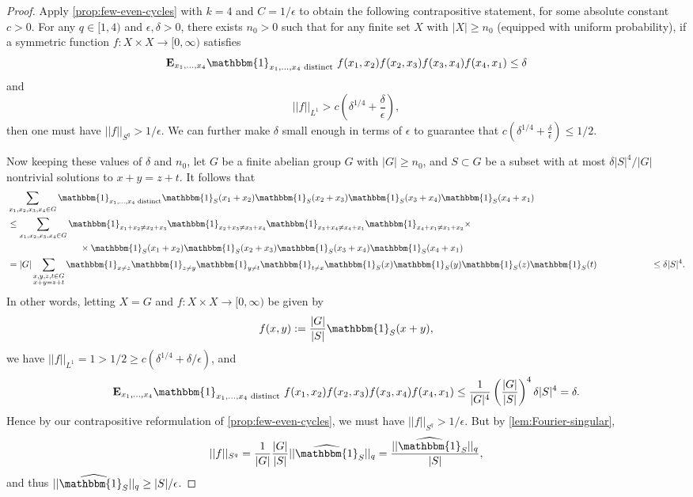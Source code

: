 \documentclass[reqno,11pt]{amsart}
\theoremstyle{definition}
\theoremstyle{remark}
\numberwithin{equation}{section}
\newcommand{\E}{\mathbf{E}}
\newcommand{\one}{\mathbbm{1}}
\renewcommand{\hat}{\widehat}
\begin{document}
\begin{proof}
Apply \cref{prop:few-even-cycles} with $k = 4$ and $C = 1/\epsilon$ to obtain the following contrapositive statement, for some absolute constant $c > 0$. For any $q \in [1, 4)$ and $\epsilon, \delta > 0$, there exists $n_0 > 0$ such that for any finite set $X$ with $|X| \ge n_0$ (equipped with uniform probability), if a symmetric function $f : X \times X \to [0, \infty)$ satisfies
\[
    \E_{x_1, \ldots, x_4} \one_{x_1,\ldots, x_4 \text{ distinct}}\ f(x_1, x_2)f(x_2, x_3)f(x_3,x_4)f(x_4,x_1) \le \delta
\]
and 
\[
    ||f||_{L^1} > c \left( \delta^{1/4} + \frac{\delta}{\epsilon} \right),
\]
then one must have $||f||_{S^q} > 1/\epsilon$. We can further make $\delta$ small enough in terms of $\epsilon$ to guarantee that $c \left( \delta^{1/4} + \frac{\delta}{\epsilon} \right) \le 1/2$.

Now keeping these values of $\delta$ and $n_0$, let $G$ be a finite abelian group $G$ with $|G| \ge n_0$, and $S \subset G$ be a subset with at most $\delta |S|^4/|G|$ nontrivial solutions to $x+y = z+t$. It follows that
\[
\begin{aligned}
    &\sum_{x_1,x_2,x_3,x_4 \in G} \one_{x_1, \ldots, x_4 \text{ distinct}} \one_S(x_1+x_2) \one_S(x_2+x_3) \one_S(x_3+x_4) \one_S(x_4+x_1)
    \\ 
    &\le 
    \sum_{x_1,x_2,x_3,x_4 \in G} \one_{x_1+x_2 \neq x_2+x_3} \one_{x_2+x_3 \neq x_3 + x_4} \one_{x_3+x_4 \neq x_4 + x_1} \one_{x_4+x_1 \neq x_1 + x_2} \times 
    \\
    & \qquad\qquad\qquad\qquad  \times \one_S(x_1+x_2) \one_S(x_2+x_3) \one_S(x_3+x_4) \one_S(x_4+x_1)
    \\
    &=
    |G| \sum_{\substack{x, y, z, t \in G \\ x+y = z+t}} \one_{x \neq z} \one_{z \neq y} \one_{y \neq t}  \one_{t \neq x} \one_S(x) \one_S(y) \one_S(z) \one_S(t)
    \qquad\qquad\qquad 
    \le \delta |S|^4.
\end{aligned}
\]
In other words, letting $X = G$ and $f : X \times X \to [0, \infty)$ be given by 
\[
    f(x,y) := \frac{|G|}{|S|} \one_S(x+y),
\]
we have $||f||_{L^1} = 1 > 1/2 \ge c(\delta^{1/4} + \delta/\epsilon)$, and 
\[
    \E_{x_1, \ldots, x_4} \one_{x_1,\ldots, x_4 \text{ distinct}}\ f(x_1, x_2)f(x_2, x_3)f(x_3,x_4)f(x_4,x_1) \le \frac{1}{|G|^4}  \left(\frac{|G|}{|S|}\right)^4 \delta |S|^4 = \delta.
\]
Hence by our contrapositive reformulation of \cref{prop:few-even-cycles}, we must have $||f||_{S^q} > 1/\epsilon$. But by \cref{lem:Fourier-singular},
\[
    ||f||_{S^q} = \frac{1}{|G|} \frac{|G|}{|S|} ||\hat{\one}_S||_{q} 
    =
    \frac{||\hat{\one}_S||_{q}}{|S|},
\]
and thus $||\hat{\one_S}||_{q} \ge |S|/\epsilon$.


\end{proof}
\fi
\end{document}
